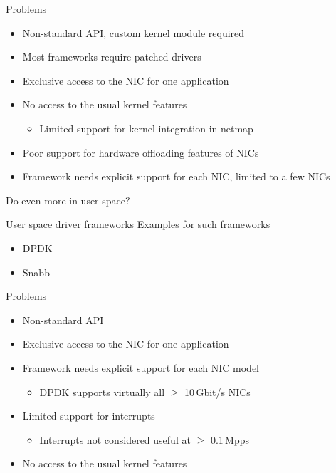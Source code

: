 \documentclass[NET,english,aspectratio=169,notitleframe]{tumbeamer}
\begin{document}
\begin{frame}{Problems}
\begin{itemize}
\item Non-standard API, custom kernel module required
\item Most frameworks require patched drivers
\item Exclusive access to the NIC for one application
\item No access to the usual kernel features
\begin{itemize}
\item Limited support for kernel integration in netmap
\end{itemize}
\item Poor support for hardware offloading features of NICs
\item Framework needs explicit support for each NIC, limited to a few NICs
\end{itemize}
\end{frame}

\begin{frame}{Do even more in user space?}
\end{frame}

\begin{frame}{User space driver frameworks}
Examples for such frameworks
\begin{itemize}
\item DPDK
\item Snabb
\end{itemize}
\end{frame}

\begin{frame}{Problems}
\begin{itemize}
\item Non-standard API
\item Exclusive access to the NIC for one application
\item Framework needs explicit support for each NIC model
\begin{itemize}
\item DPDK supports virtually all $\ge$ 10\,Gbit/s NICs
\end{itemize}
\item Limited support for interrupts
\begin{itemize}
\item Interrupts not considered useful at $\ge$ 0.1\,Mpps
\end{itemize}
\item No access to the usual kernel features
\end{itemize}
\end{frame}
\end{document}
